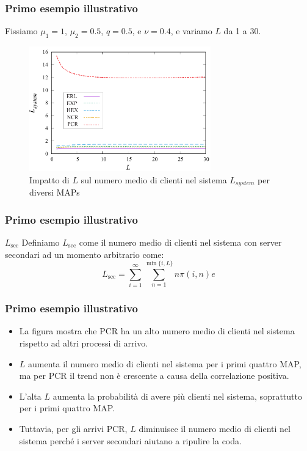 \documentclass{beamer}
\begin{document}
\begin{frame}
    \frametitle{Primo esempio illustrativo}
    Fissiamo $\mu_1=1$, $\mu_2=0.5$, $q=0.5$, e $\nu=0.4$, e variamo $L$ da 1 a 30.
    \begin{figure}[h]
        \centering
        \includegraphics[width=0.7\textwidth]{gtHnIzQ.png}
        \caption{Impatto di $L$ sul numero medio di clienti nel sistema $L_{system}$ per diversi MAPs}
        \label{fig:1}
    \end{figure}
\end{frame}


\begin{frame}
    \frametitle{Primo esempio illustrativo}
    \begin{block}{$L_{\mathrm{sec}}$}
        Definiamo $L_{\mathrm{sec}}$ come il numero medio di clienti nel sistema con server secondari ad un momento arbitrario come:
        $$ L_{\mathrm{sec}} = \sum_{i=1}^{\infty} \sum_{n=1}^{\min\{i,L\}} n \pi (i,n) e $$
    \end{block}
\end{frame}


\begin{frame}
    \frametitle{Primo esempio illustrativo}
        \begin{itemize}
            \item La figura mostra che PCR ha un alto numero medio di clienti nel sistema rispetto ad altri processi di arrivo.
            \item $L$ aumenta il numero medio di clienti nel sistema per i primi quattro MAP, ma per PCR il trend non è crescente a causa della correlazione positiva.
            \item L'alta $L$ aumenta la probabilità di avere più clienti nel sistema, soprattutto per i primi quattro MAP.
            \item Tuttavia, per gli arrivi PCR, $L$ diminuisce il numero medio di clienti nel sistema perché i server secondari aiutano a ripulire la coda.
        \end{itemize}
\end{frame}
\end{document}
